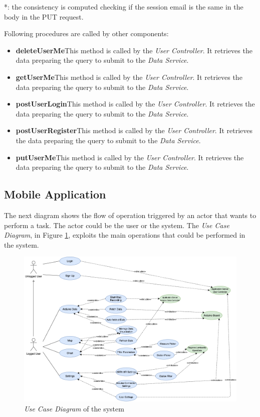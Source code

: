 *: the consistency is computed checking if the session email is the same in the body in the PUT request.

Following procedures are called by other components:
\begin{itemize}
    \item \textbf{deleteUserMe}\quad This method is called by the \textit{User Controller}. It retrieves the data preparing the query to submit to the \textit{Data Service}.
    \item \textbf{getUserMe}\quad This method is called by the \textit{User Controller}. It retrieves the data preparing the query to submit to the \textit{Data Service}.
    \item \textbf{postUserLogin}\quad This method is called by the \textit{User Controller}. It retrieves the data preparing the query to submit to the \textit{Data Service}.
    \item \textbf{postUserRegister}\quad This method is called by the \textit{User Controller}. It retrieves the data preparing the query to submit to the \textit{Data Service}.
    \item \textbf{putUserMe}\quad This method is called by the \textit{User Controller}. It retrieves the data preparing the query to submit to the \textit{Data Service}.
\end{itemize}

\subsection{Mobile Application}\label{sec:ci_mobile}
The next diagram shows the flow of operation triggered by an actor that wants to perform a task. The actor could be the user or the system. The \textit{Use Case Diagram}, in Figure \ref{img:archi_usecase}, exploits the main operations that could be performed in the system. 

\begin{figure}[H]
\begin{center}
  \includegraphics[width=\textwidth]{img/archi/usecase.png}
  \hspace{0.05\linewidth}
  \centering
  \caption{\textit{Use Case Diagram} of the system}
  \label{img:archi_usecase}
\end{center}
\end{figure}


